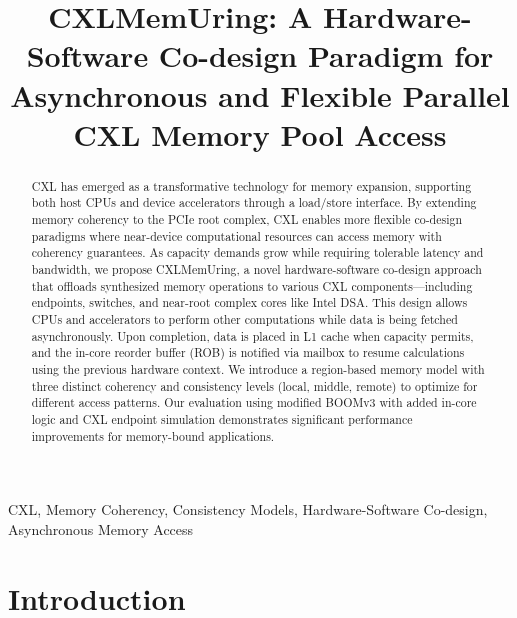 \documentclass[10pt,conference]{IEEEtran}
\begin{document}
\title{CXLMemUring: A Hardware-Software Co-design Paradigm for\\
Asynchronous and Flexible Parallel CXL Memory Pool Access}

\author{
}

\maketitle

\begin{abstract}
CXL has emerged as a transformative technology for memory expansion, supporting both host CPUs and device accelerators through a load/store interface. By extending memory coherency to the PCIe root complex, CXL enables more flexible co-design paradigms where near-device computational resources can access memory with coherency guarantees. As capacity demands grow while requiring tolerable latency and bandwidth, we propose CXLMemUring, a novel hardware-software co-design approach that offloads synthesized memory operations to various CXL components—including endpoints, switches, and near-root complex cores like Intel DSA. This design allows CPUs and accelerators to perform other computations while data is being fetched asynchronously. Upon completion, data is placed in L1 cache when capacity permits, and the in-core reorder buffer (ROB) is notified via mailbox to resume calculations using the previous hardware context. We introduce a region-based memory model with three distinct coherency and consistency levels (local, middle, remote) to optimize for different access patterns. Our evaluation using modified BOOMv3 with added in-core logic and CXL endpoint simulation demonstrates significant performance improvements for memory-bound applications.
\end{abstract}

\begin{IEEEkeywords}
CXL, Memory Coherency, Consistency Models, Hardware-Software Co-design, Asynchronous Memory Access
\end{IEEEkeywords}

\section{Introduction}
\end{document}
